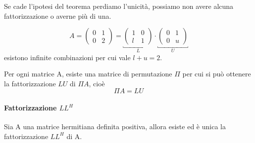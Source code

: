 Se cade l'ipotesi del teorema perdiamo l'unicit\`a, possiamo non avere
alcuna fattorizzazione o averne più di una.
\begin{example}
\[ 
A = 
\begin{pmatrix}
0 & 1 \\
0 & 2 
\end{pmatrix}
= \underbracket{
\begin{pmatrix}
1 & 0  \\
l & 1 
\end{pmatrix}}_{L}
\cdot \underbracket{
\begin{pmatrix}
0 & 1  \\
0 & u 
\end{pmatrix}}_{U}
\]
esistono infinite combinazioni per cui vale $l+u=2$.
\end{example}

\begin{theo}
  Per ogni matrice A, esiste una matrice di permutazione $\Pi$ per cui
  si può ottenere la fattorizzazione $LU$ di $\Pi A$, cio\`e
  $$\Pi A = LU$$
\end{theo}


\paragraph{Fattorizzazione $LL^{H}$}
\begin{theo}\label{th:esistenza-LL}
Sia A una matrice hermitiana definita positiva, allora esiste ed \`e
unica la fattorizzazione $LL^H$ di A.
\end{theo}

